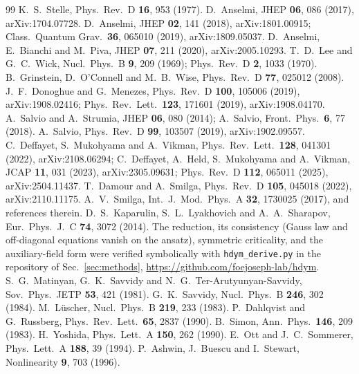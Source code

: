 \documentclass[11pt,a4paper]{article}
\begin{document}
\begin{thebibliography}{99}
\small
{} K.~S.~Stelle, Phys.\ Rev.\ D {\bf 16}, 953 (1977).
 D.~Anselmi, JHEP {\bf 06}, 086 (2017), arXiv:1704.07728.
 D.~Anselmi, JHEP {\bf 02}, 141 (2018), arXiv:1801.00915; Class.\ Quantum Grav.\ {\bf 36}, 065010 (2019), arXiv:1809.05037.
 D.~Anselmi, E.~Bianchi and M.~Piva, JHEP {\bf 07}, 211 (2020), arXiv:2005.10293.
 T.~D.~Lee and G.~C.~Wick, Nucl.\ Phys.\ B {\bf 9}, 209 (1969); Phys.\ Rev.\ D {\bf 2}, 1033 (1970).
 B.~Grinstein, D.~O'Connell and M.~B.~Wise, Phys.\ Rev.\ D {\bf 77}, 025012 (2008).
 J.~F.~Donoghue and G.~Menezes, Phys.\ Rev.\ D {\bf 100}, 105006 (2019), arXiv:1908.02416; Phys.\ Rev.\ Lett.\ {\bf 123}, 171601 (2019), arXiv:1908.04170.
 A.~Salvio and A.~Strumia, JHEP {\bf 06}, 080 (2014); A.~Salvio, Front.\ Phys.\ {\bf 6}, 77 (2018).
 A.~Salvio, Phys.\ Rev.\ D {\bf 99}, 103507 (2019), arXiv:1902.09557.
 C.~Deffayet, S.~Mukohyama and A.~Vikman, Phys.\ Rev.\ Lett.\ {\bf 128}, 041301 (2022), arXiv:2108.06294; C.~Deffayet, A.~Held, S.~Mukohyama and A.~Vikman, JCAP {\bf 11}, 031 (2023), arXiv:2305.09631; Phys.\ Rev.\ D {\bf 112}, 065011 (2025), arXiv:2504.11437.
 T.~Damour and A.~Smilga, Phys.\ Rev.\ D {\bf 105}, 045018 (2022), arXiv:2110.11175.
 A.~V.~Smilga, Int.\ J.\ Mod.\ Phys.\ A {\bf 32}, 1730025 (2017), and references therein.
 D.~S.~Kaparulin, S.~L.~Lyakhovich and A.~A.~Sharapov, Eur.\ Phys.\ J.\ C {\bf 74}, 3072 (2014).
 The reduction, its consistency (Gauss law and off-diagonal equations vanish on the ansatz), symmetric criticality, and the auxiliary-field form were verified symbolically with \texttt{hdym\_derive.py} in the repository of Sec.~\ref{sec:methods}, \url{https://github.com/foejoseph-lab/hdym}.
 S.~G.~Matinyan, G.~K.~Savvidy and N.~G.~Ter-Arutyunyan-Savvidy, Sov.\ Phys.\ JETP {\bf 53}, 421 (1981).
 G.~K.~Savvidy, Nucl.\ Phys.\ B {\bf 246}, 302 (1984).
 M.~L\"uscher, Nucl.\ Phys.\ B {\bf 219}, 233 (1983).
 P.~Dahlqvist and G.~Russberg, Phys.\ Rev.\ Lett.\ {\bf 65}, 2837 (1990).
 B.~Simon, Ann.\ Phys.\ {\bf 146}, 209 (1983).
 H.~Yoshida, Phys.\ Lett.\ A {\bf 150}, 262 (1990).
 E.~Ott and J.~C.~Sommerer, Phys.\ Lett.\ A {\bf 188}, 39 (1994).
 P.~Ashwin, J.~Buescu and I.~Stewart, Nonlinearity {\bf 9}, 703 (1996).

\end{thebibliography}
\end{document}
